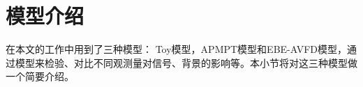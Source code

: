 



%





\section{模型介绍}

在本文的工作中用到了三种模型： Toy模型，APMPT模型和EBE-AVFD模型，通过模型来检验、对比不同观测量对信号、背景的影响等。本小节将对这三种模型做一个简要介绍。

